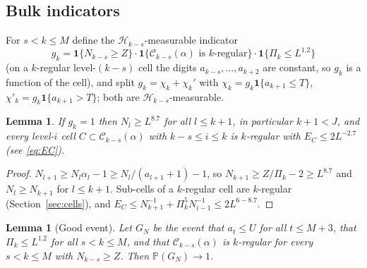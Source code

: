 \documentclass[11pt]{amsart}
\newtheorem{lemma}[theorem]{Lemma}
\theoremstyle{definition}
\numberwithin{equation}{section}
\newcommand{\Prob}{\mathbb{P}}
\newcommand{\cH}{\mathcal{H}}
\newcommand{\cC}{\mathcal{C}}
\newcommand{\ind}{\mathbf{1}}
\begin{document}
\subsection{Bulk indicators}
For $s<k\le M$ define the $\cH_{k-s}$-measurable indicator
\[
g_k=\ind\{N_{k-s}\ge Z\}\cdot\ind\{\cC_{k-s}(\alpha)\text{ is $k$-regular}\}\cdot\ind\{\Pi_k\le L^{1.2}\}
\]
(on a $k$-regular level-$(k-s)$ cell the digits $a_{k-s},\dots,a_{k+2}$ are constant, so $g_k$ is a function of the cell), and split
$g_k=\chi_k+\chi_k'$ with $\chi_k=g_k\ind\{a_{k+1}\le T\}$, $\chi'_k=g_k\ind\{a_{k+1}>T\}$; both are $\cH_{k-s}$-measurable.

\begin{lemma}\label{lem:bulkfacts}
If $g_k=1$ then $N_l\ge L^{8.7}$ for all $l\le k+1$, in particular $k+1<J$, and every level-$i$ cell $C\subset\cC_{k-s}(\alpha)$ with
$k-s\le i\le k$ is $k$-regular with $E_C\le2L^{-2.7}$ (see \eqref{eq:EC}).
\end{lemma}

\begin{proof}
$N_{l+1}\ge N_l\alpha_l-1\ge N_l/(a_{l+1}+1)-1$, so $N_{k+1}\ge Z/\Pi_k-2\ge L^{8.7}$ and $N_l\ge N_{k+1}$ for $l\le k+1$. Sub-cells of a
$k$-regular cell are $k$-regular (Section~\ref{sec:cells}), and $E_C\le N_{k+1}^{-1}+\Pi_k^5N_{i-1}^{-1}\le 2L^{6-8.7}$.
\end{proof}

\begin{lemma}[Good event]\label{lem:good}
Let $G_N$ be the event that $a_t\le U$ for all $t\le M+3$, that $\Pi_k\le L^{1.2}$ for all $s<k\le M$, and that $\cC_{k-s}(\alpha)$ is
$k$-regular for every $s<k\le M$ with $N_{k-s}\ge Z$. Then $\Prob(G_N)\to1$.
\end{lemma}
\end{document}
